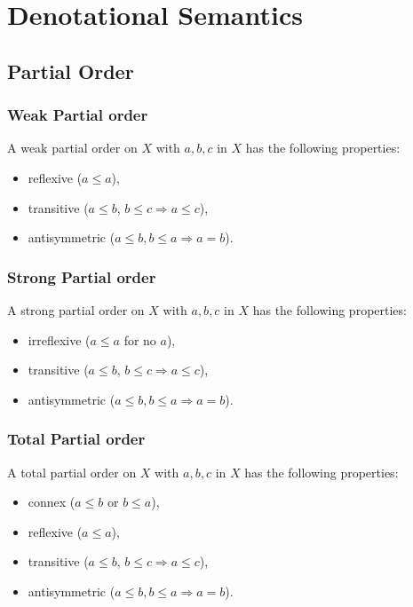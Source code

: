 \section{Denotational Semantics}

\subsection{Partial Order}

\subsubsection{Weak Partial order}

A weak partial order on $X$ with $a, b, c$ in $X$ 
has the following properties: \begin{itemize}
  \item reflexive ($a \leq a$),
  \item transitive ($a \leq b$, $b \leq c \Rightarrow a \leq c$),
  \item antisymmetric ($a \leq b, b \leq a \Rightarrow a = b$).
\end{itemize}

\subsubsection{Strong Partial order}

A strong partial order on $X$ with $a, b, c$ in $X$ 
has the following properties: \begin{itemize}
  \item irreflexive ($a \leq a$ for no $a$),
  \item transitive ($a \leq b$, $b \leq c \Rightarrow a \leq c$),
  \item antisymmetric ($a \leq b, b \leq a \Rightarrow a = b$).
\end{itemize}

\subsubsection{Total Partial order}

A total partial order on $X$ with $a, b, c$ in $X$ 
has the following properties: \begin{itemize}
  \item connex ($a \leq b$ or $b \leq a$),
  \item reflexive ($a \leq a$),
  \item transitive ($a \leq b$, $b \leq c \Rightarrow a \leq c$),
  \item antisymmetric ($a \leq b, b \leq a \Rightarrow a = b$).
\end{itemize}

